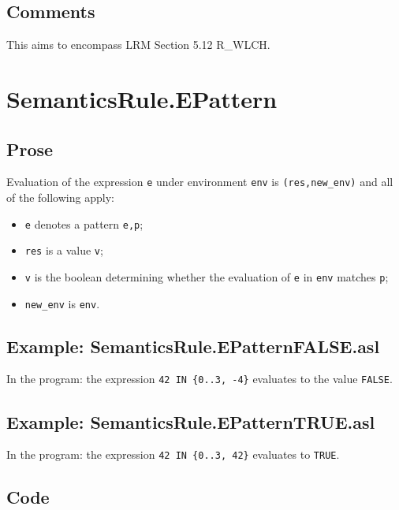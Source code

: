 \documentclass{book}
\begin{document}
\subsection{Comments}
  This aims to encompass LRM Section 5.12 R\_WLCH.

\section{SemanticsRule.EPattern \label{sec:SemanticsRule.EPattern}}


  \subsection{Prose}
  Evaluation of the expression \texttt{e} under environment \texttt{env} is
  \texttt{(res,new\_env)} and all of the following apply:
  \begin{itemize}
  \item \texttt{e} denotes a pattern \texttt{e,p};
  \item \texttt{res} is a value \texttt{v};
  \item \texttt{v} is the boolean determining whether the evaluation of \texttt{e} in \texttt{env} matches \texttt{p};
  \item \texttt{new\_env} is \texttt{env}.
  \end{itemize}

  \subsection{Example: SemanticsRule.EPatternFALSE.asl}
    In the program:
    the expression \texttt{42 IN \{0..3, -4\}} evaluates to the value \texttt{FALSE}.

  \subsection{Example: SemanticsRule.EPatternTRUE.asl}
    In the program:
    the expression \texttt{42 IN \{0..3, 42\}} evaluates to \texttt{TRUE}.

  \subsection{Code}
\end{document}
